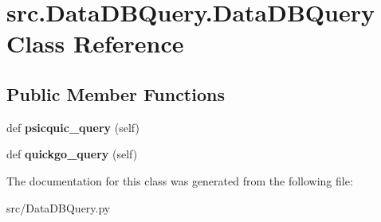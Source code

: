 \hypertarget{classsrc_1_1DataDBQuery_1_1DataDBQuery}{}\section{src.\+Data\+D\+B\+Query.\+Data\+D\+B\+Query Class Reference}
\label{classsrc_1_1DataDBQuery_1_1DataDBQuery}
\subsection*{Public Member Functions}
\begin{DoxyCompactItemize}
\item 
\hypertarget{classsrc_1_1DataDBQuery_1_1DataDBQuery_a00186f5b2107807a17c9c0bd9f0e29db}{}def {\bfseries psicquic\+\_\+query} (self)\label{classsrc_1_1DataDBQuery_1_1DataDBQuery_a00186f5b2107807a17c9c0bd9f0e29db}

\item 
\hypertarget{classsrc_1_1DataDBQuery_1_1DataDBQuery_a33a7a02a723cf2dd9a8ed98ff43b3828}{}def {\bfseries quickgo\+\_\+query} (self)\label{classsrc_1_1DataDBQuery_1_1DataDBQuery_a33a7a02a723cf2dd9a8ed98ff43b3828}

\end{DoxyCompactItemize}


The documentation for this class was generated from the following file\+:\begin{DoxyCompactItemize}
\item 
src/Data\+D\+B\+Query.\+py\end{DoxyCompactItemize}

